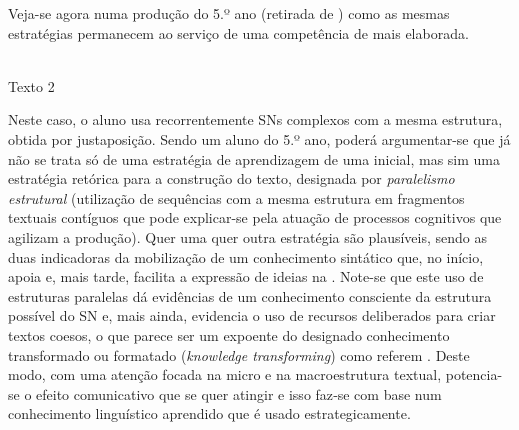 \documentclass[output=paper]{LSP/langsci}
\begin{document}
Veja-se agora numa produção do 5.º ano (retirada de \citealt{costagoncalves2010}) como as mesmas estratégias permanecem ao serviço de uma competência de  mais elaborada. 

\begin{center}
\\\vspace{1em}Texto 2
\end{center}

Neste caso, o aluno usa recorrentemente SNs complexos com a mesma estrutura, obtida por justaposição. Sendo um aluno do 5.º ano, poderá argumentar-se que já não se trata só de uma estratégia de aprendizagem de uma  inicial, mas sim uma estratégia retórica para a construção do texto, designada por \textit{paralelismo estrutural} (utilização de sequências com a mesma estrutura em fragmentos textuais contíguos que pode explicar-se pela atuação de processos cognitivos que agilizam a produção). Quer uma quer outra estratégia são plausíveis, sendo as duas indicadoras da mobilização de um conhecimento sintático que, no início, apoia e, mais tarde, facilita a expressão de ideias na . Note-se que este uso de estruturas paralelas dá evidências de um conhecimento consciente da estrutura possível do SN e, mais ainda, evidencia o uso de recursos deliberados para criar textos coesos, o que parece ser um expoente do designado conhecimento transformado ou formatado (\textit{knowledge transforming}) como referem \cite{scardamaliabereiter1987}. Deste modo, com uma atenção focada na micro e na macroestrutura textual, potencia-se o efeito comunicativo que se quer atingir e isso faz‑se com base num conhecimento linguístico aprendido que é usado estrategicamente.
\end{document}

